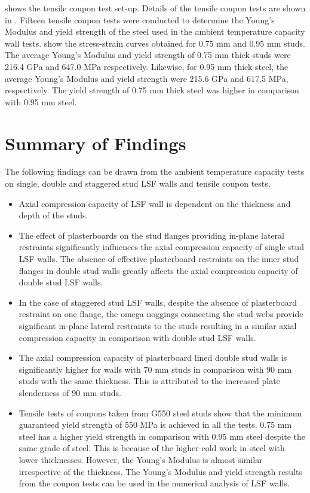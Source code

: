  shows the tensile coupon test set-up. Details of the tensile coupon tests are shown in . Fifteen tensile coupon tests were conducted to determine the Young's Modulus and yield strength of the steel used in the ambient temperature capacity wall tests.  show the stress-strain curves obtained for 0.75 mm and 0.95 mm studs. The average Young's Modulus and yield strength of 0.75 mm thick studs were 216.4 GPa and 647.0 MPa respectively. Likewise, for 0.95 mm thick steel, the average Young's Modulus and yield strength were 215.6 GPa and 617.5 MPa, respectively. The yield strength of 0.75 mm thick steel was higher in comparison with 0.95 mm steel. 

\section{Summary of Findings}

The following findings can be drawn from the ambient temperature capacity tests on single, double and staggered stud LSF walls and tensile coupon tests.
\begin{itemize}
	\item Axial compression capacity of LSF wall is dependent on the thickness and depth of the studs.
	\item The effect of plasterboards on the stud flanges providing in-plane lateral restraints significantly influences the axial compression capacity of single stud LSF walls. The absence of effective plasterboard restraints on the inner stud flanges in double stud walls greatly affects the axial compression capacity of double stud LSF walls.
	\item In the case of staggered stud LSF walls, despite the absence of plasterboard restraint on one flange, the omega noggings connecting the stud webs provide significant in-plane lateral restraints to the studs resulting in a similar axial compression capacity in comparison with double stud LSF walls.
	\item The axial compression capacity of plasterboard lined double stud walls is significantly higher for walls with 70 mm studs in comparison with 90 mm studs with the same thickness. This is attributed to the increased plate slenderness of 90 mm studs. 
	\item Tensile tests of coupons taken from G550 steel studs show that the minimum guaranteed yield strength of 550 MPa is achieved in all the tests. 0.75 mm steel has a higher yield strength in comparison with 0.95 mm steel despite the same grade of steel. This is because of the higher cold work in steel with lower thicknesses. However, the Young's Modulus is almost similar irrespective of the thickness. The Young's Modulus and yield strength results from the coupon tests can be used in the numerical analysis of LSF walls. 
\end{itemize}
  
  
  

